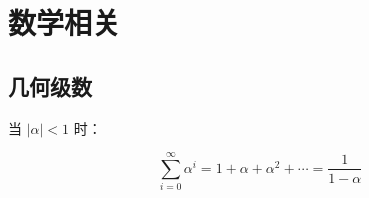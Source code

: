 \chapter*{数学相关}

\section*{几何级数}

当 $|\alpha| < 1$ 时： 

$$\sum_{i=0}^\infty \alpha^i = 1 + \alpha + \alpha^2 + \cdots  = \frac{1}{1-\alpha}$$